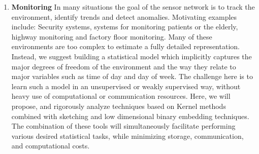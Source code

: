 \begin{enumerate}
    \item {\bf Monitoring} In many situations the goal of the sensor network is to track the environment, identify trends and detect anomalies. Motivating examples include: Security systems, systems for monitoring patients or the elderly, highway monitoring and factory floor monitoring. Many of these environments are too complex to estimate a fully detailed representation. Instead, we suggest building a statistical model which implicitly captures the major degrees of freedom of the environment and the way they relate to major variables such as time of day and day of week.  The challenge here is to learn such a model in an unsupervised or weakly supervised way, without heavy use of computational or communication resources. Here, we will propose, and rigorously analyze techniques based on Kernel methods combined with sketching and low dimensional binary embedding techniques. The combination of these tools will simultaneously facilitate performing various desired statistical tasks, while minimizing storage, communication, and computational costs. 
    
\end{enumerate}

